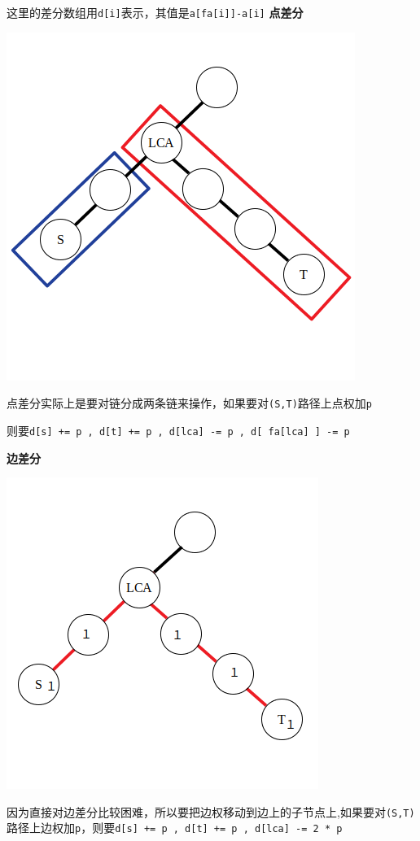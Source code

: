 这里的差分数组用\verb|d[i]|表示，其值是\verb|a[fa[i]]-a[i]|
\textbf{点差分}
\begin{center}
    \includegraphics[scale=0.5]{图论/树/树上差分_点差分.png}
\end{center}

点差分实际上是要对链分成两条链来操作，如果要对\verb|(S,T)|路径上点权加\verb|p|

则要\verb|d[s] += p , d[t] += p , d[lca] -= p , d[ fa[lca] ] -= p|

\textbf{边差分}
\begin{center}
    \includegraphics[scale=0.5]{图论/树/树上差分_边差分}
\end{center}

因为直接对边差分比较困难，所以要把边权移动到边上的子节点上,如果要对\verb|(S,T)|路径上边权加\verb|p|，则要\verb|d[s] += p , d[t] += p , d[lca] -= 2 * p|

